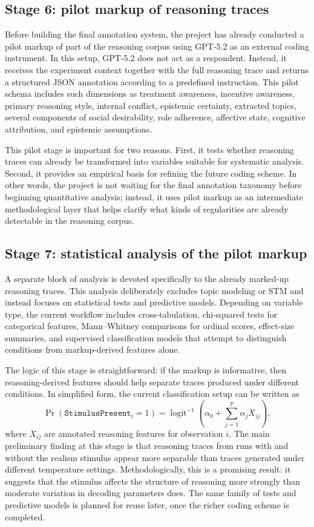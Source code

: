 \documentclass[14pt,a4paper]{extarticle}
\begin{document}
\subsection{Stage 6: pilot markup of reasoning traces}

Before building the final annotation system, the project has already conducted a pilot markup of part of the reasoning corpus using GPT-5.2 as an external coding instrument. In this setup, GPT-5.2 does not act as a respondent. Instead, it receives the experiment context together with the full reasoning trace and returns a structured JSON annotation according to a predefined instruction. This pilot schema includes such dimensions as treatment awareness, incentive awareness, primary reasoning style, internal conflict, epistemic certainty, extracted topics, several components of social desirability, role adherence, affective state, cognitive attribution, and epistemic assumptions.

This pilot stage is important for two reasons. First, it tests whether reasoning traces can already be transformed into variables suitable for systematic analysis. Second, it provides an empirical basis for refining the future coding scheme. In other words, the project is not waiting for the final annotation taxonomy before beginning quantitative analysis; instead, it uses pilot markup as an intermediate methodological layer that helps clarify what kinds of regularities are already detectable in the reasoning corpus.

\subsection{Stage 7: statistical analysis of the pilot markup}

A separate block of analysis is devoted specifically to the already marked-up reasoning traces. This analysis deliberately excludes topic modeling or STM and instead focuses on statistical tests and predictive models. Depending on variable type, the current workflow includes cross-tabulation, chi-squared tests for categorical features, Mann--Whitney comparisons for ordinal scores, effect-size summaries, and supervised classification models that attempt to distinguish conditions from markup-derived features alone.

The logic of this stage is straightforward: if the markup is informative, then reasoning-derived features should help separate traces produced under different conditions. In simplified form, the current classification setup can be written as
\[
\Pr(\texttt{StimulusPresent}_i = 1) = \operatorname{logit}^{-1}\!\left(\alpha_0 + \sum_{j=1}^{p}\alpha_j X_{ij}\right),
\]
where \(X_{ij}\) are annotated reasoning features for observation \(i\). The main preliminary finding at this stage is that reasoning traces from runs with and without the realism stimulus appear more separable than traces generated under different temperature settings. Methodologically, this is a promising result: it suggests that the stimulus affects the structure of reasoning more strongly than moderate variation in decoding parameters does. The same family of tests and predictive models is planned for reuse later, once the richer coding scheme is completed.
\end{document}

